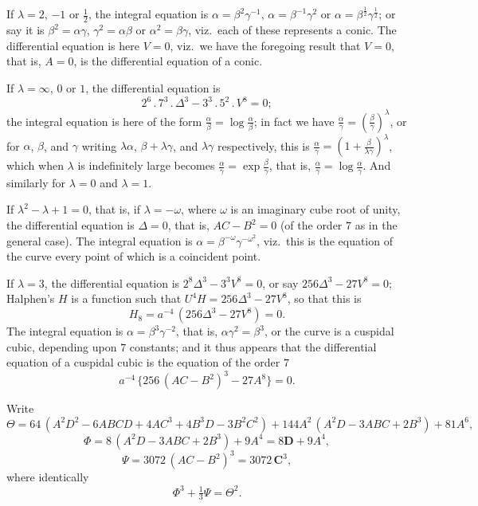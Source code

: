 \documentclass[11pt]{article}
\begin{document}
If $\lambda = 2$, $-1$ or $\tfrac{1}{2}$, the integral equation is $\alpha = \beta^2\gamma^{-1}$, $\alpha = \beta^{-1}\gamma^2$ or $\alpha = \beta^{\tfrac{1}{2}}\gamma^{\tfrac{1}{2}}$; or say it is $\beta^2 = \alpha\gamma$, $\gamma^2 = \alpha\beta$ or $\alpha^2 = \beta\gamma$, viz.\ each of these represents a conic. The differential equation is here $V = 0$, viz.\ we have the foregoing result that $V = 0$, that is, $A = 0$, is the differential equation of a conic.

If $\lambda = \infty$, $0$ or $1$, the differential equation is
\[
2^6\,.\,7^3\,.\,\Delta^3 - 3^3\,.\,5^2\,.\,V^8 = 0;
\]
the integral equation is here of the form $\tfrac{\alpha}{\beta} = \log\tfrac{\alpha}{\beta}$; in fact we have $\tfrac{\alpha}{\gamma} = \left(\tfrac{\beta}{\gamma}\right)^\lambda$, or for $\alpha$, $\beta$, and $\gamma$ writing $\lambda\alpha$, $\beta + \lambda\gamma$, and $\lambda\gamma$ respectively, this is $\tfrac{\alpha}{\gamma} = \left(1 + \tfrac{\beta}{\lambda\gamma}\right)^\lambda$, which when $\lambda$ is indefinitely large becomes $\tfrac{\alpha}{\gamma} = \exp\tfrac{\beta}{\gamma}$, that is, $\tfrac{\alpha}{\gamma} = \log\tfrac{\alpha}{\gamma}$. And similarly for $\lambda = 0$ and $\lambda = 1$.

If $\lambda^2 - \lambda + 1 = 0$, that is, if $\lambda = -\omega$, where $\omega$ is an imaginary cube root of unity, the differential equation is $\Delta = 0$, that is, $A C - B^2 = 0$ (of the order $7$ as in the general case). The integral equation is $\alpha = \beta^{-\omega}\gamma^{-\omega^2}$, viz.\ this is the equation of the curve every point of which is a coincident point.

If $\lambda = 3$, the differential equation is $2^8\Delta^3 - 3^3 V^8 = 0$, or say $256\Delta^3 - 27 V^8 = 0$; Halphen's $H$ is a function such that $U^4 H = 256\Delta^3 - 27 V^8$, so that this is
\[
H_8 = a^{-4}\,(256\Delta^3 - 27 V^8) = 0.
\]
The integral equation is $\alpha = \beta^3\gamma^{-2}$, that is, $\alpha\gamma^2 = \beta^3$, or the curve is a cuspidal cubic, depending upon $7$ constants; and it thus appears that the differential equation of a cuspidal cubic is the equation of the order $7$
\[
a^{-4}\,\{256\,(A C - B^2)^3 - 27 A^8\} = 0.
\]

Write
\[
\Theta = 64\,(A^2 D^2 - 6 A B C D + 4 A C^3 + 4 B^3 D - 3 B^2 C^2) + 144 A^2\,(A^2 D - 3 A B C + 2 B^3) + 81 A^6,
\]
\[
\Phi = 8\,(A^2 D - 3 A B C + 2 B^3) + 9 A^4 = 8\mathbf{D} + 9 A^4,
\]
\[
\Psi = 3072\,(A C - B^2)^3 = 3072\,\mathbf{C}^3,
\]
where identically
\[
\Phi^3 + \tfrac{1}{3}\Psi = \Theta^2.
\]
\end{document}
